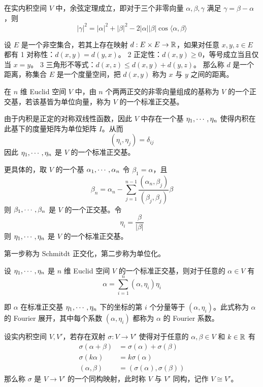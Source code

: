 \begin{proposition}
    在实内积空间 $V$ 中，余弦定理成立，即对于三个非零向量 $\alpha,\beta,\gamma$ 满足 $\gamma = \beta - \alpha$，则
    \[ |\gamma|^2  = |\alpha|^2 + |\beta|^2 - 2 |\alpha| |\beta| \cos\langle\alpha,\beta\rangle \]
\end{proposition}

\begin{definition}
    设 $E$ 是一个非空集合，若其上存在映射 $d : E \times E \to \mathbb{R}$，如果对任意 $x,y,z\in E$ 都有
    \num{1} 对称性：$d(x,y) = d(y,x)$。
    \num{2} 正定性：$d(x,y) \geqslant $0，等号成立当且仅当 $x = y$。
    \num{3} 三角形不等式：$d(x,z) \leqslant d(x,y) + d(y,z)$。
    那么称 $d$ 是一个距离，称集合 $E$ 是一个度量空间，把 $d(x,y)$ 称为 $x$ 与 $y$ 之间的距离。
\end{definition}

\begin{definition}
    在 $n$ 维 Euclid 空间 $V$ 中，由 $n$ 个两两正交的非零向量组成的基称为 $V$ 的一个正交基，若该基皆为单位向量，称为 $V$ 的一个标准正交基。
\end{definition}

由于内积是正定的对称双线性函数，因此 $V$ 中存在一个基 $\eta_1,\cdots,\eta_n$ 使得内积在此基下的度量矩阵为单位矩阵 $I$。从而
\[ (\eta_i,\eta_j) = \delta_{ij} \]
因此 $\eta_1,\cdots,\eta_n$ 是 $V$ 的一个标准正交基。

更具体的，取 $V$ 的一个基 $\alpha_1,\cdots,\alpha_n$ 令 $\beta_1 = \alpha$，且
\[ \beta_n = \alpha_n - \sum_{j=1}^{n-1} \frac{(\alpha_n,\beta_j)}{(\beta_j,\beta_j)} \beta \]
则 $\beta_1,\cdots,\beta_n$ 是 $V$ 的一个正交基。令
\[ \eta_i = \frac{\beta}{|\beta|} \]
则 $\eta_1,\cdots,\eta_n$ 是 $V$ 的一个标准正交基。

第一步称为 Schmitdt 正交化，第二步称为单位化。

\begin{theorem}
    设 $\eta_1,\cdots,\eta_n$ 是 $n$ 维 Euclid 空间 $V$ 的一个标准正交基，则对于任意的 $\alpha \in V$ 有
    \[ \alpha = \sum_{i=1}^n (\alpha,\eta_i)\eta_i \]
\end{theorem}

即 $\alpha$ 在标准正交基 $\eta_1,\cdots,\eta_n$ 下的坐标的第 $i$ 个分量等于 $(\alpha,\eta_i)$。此式称为 $\alpha$ 的 Fourier 展开，其中每个系数 $(\alpha,\eta_i)$ 都称为 $\alpha$ 的 Fourier 系数。

\begin{definition}
    设实内积空间 $V,V'$，若存在双射 $\sigma : V \to V'$ 使得对于任意的 $\alpha,\beta \in V$ 和 $k \in \mathbb{R}$ 有
    \begin{equation*}
        \begin{aligned}
            \sigma(\alpha + \beta) &= \sigma(\alpha) + \sigma(\beta)\\
            \sigma(k\alpha) &= k\sigma(\alpha)\\
            (\alpha,\beta) &= (\sigma(\alpha),\sigma(\beta))
        \end{aligned}
    \end{equation*}
    那么称 $\sigma$ 是 $V \to V'$ 的一个同构映射，此时称 $V$ 与 $V'$ 同构，记作 $V \cong V'$。
\end{definition}

